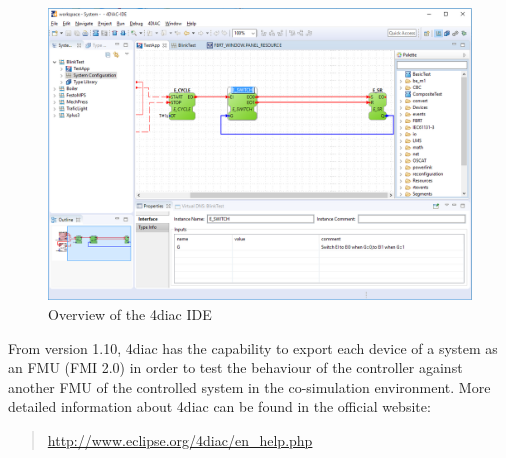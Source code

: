 %
\begin{figure}[hpt!]
  \centerline{\includegraphics[width=\textwidth]{figures/4diac-overview.png}}
  \caption{Overview of the 4diac IDE}
  \label{figure:4diac-overview}
\end{figure}
%
%
From version 1.10, 4diac has the capability to export each device of a system as an FMU (FMI 2.0) in order to test the behaviour of the controller against another FMU of the controlled system in 
the co-simulation environment. More detailed information about 4diac can be found in the official website:
%
\begin{quote}
  \url{http://www.eclipse.org/4diac/en_help.php}
\end{quote} 
%
%
%
